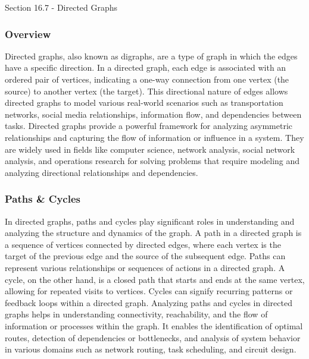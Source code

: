 \begin{notes}{Section 16.7 - Directed Graphs}
    \subsubsection*{Overview}

    Directed graphs, also known as digraphs, are a type of graph in which the edges have a specific direction. In a directed graph, each edge is associated with an ordered pair of vertices, indicating a one-way 
    connection from one vertex (the source) to another vertex (the target). This directional nature of edges allows directed graphs to model various real-world scenarios such as transportation networks, social 
    media relationships, information flow, and dependencies between tasks. Directed graphs provide a powerful framework for analyzing asymmetric relationships and capturing the flow of information or influence 
    in a system. They are widely used in fields like computer science, network analysis, social network analysis, and operations research for solving problems that require modeling and analyzing directional 
    relationships and dependencies.
    
    \subsubsection*{Paths \& Cycles}
    
    In directed graphs, paths and cycles play significant roles in understanding and analyzing the structure and dynamics of the graph. A path in a directed graph is a sequence of vertices connected by directed 
    edges, where each vertex is the target of the previous edge and the source of the subsequent edge. Paths can represent various relationships or sequences of actions in a directed graph. A cycle, on the other 
    hand, is a closed path that starts and ends at the same vertex, allowing for repeated visits to vertices. Cycles can signify recurring patterns or feedback loops within a directed graph. Analyzing paths and 
    cycles in directed graphs helps in understanding connectivity, reachability, and the flow of information or processes within the graph. It enables the identification of optimal routes, detection of dependencies 
    or bottlenecks, and analysis of system behavior in various domains such as network routing, task scheduling, and circuit design.
\end{notes}

